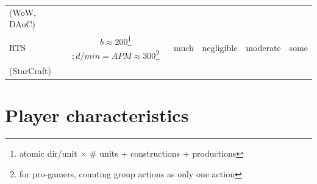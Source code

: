 \begin{table}
\begin{tabular}{|l|ccccc|}
(WoW, DAoC) & & & & & \\
RTS & $b\approx 200$\footnote{atomic dir/unit $\times$ \# units + constructions + productions}$;d/min=APM\approx 300$\footnote{for pro-gamers, counting group actions as only one action} & much & negligible & moderate & some \\
(StarCraft) & & & & & \\
\hline
\end{tabular}
\label{recapgames}
\end{table}


\section{Player characteristics}


